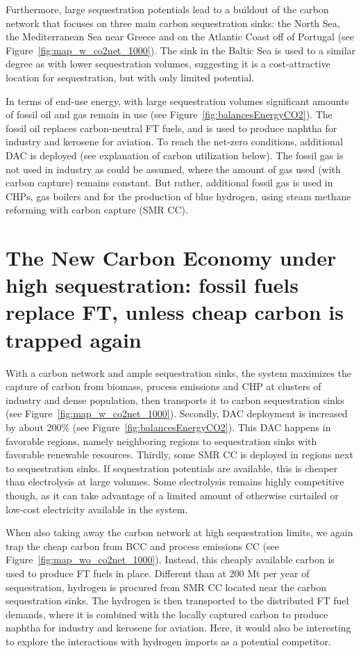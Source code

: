 \documentclass[10pt,5p,reversenotenum,lefttitle]{elsarticle}
\begin{document}
Furthermore, large sequestration potentials lead to a buildout of the carbon network that focuses on three main carbon sequestration sinks: the North Sea, the Mediterranean Sea near Greece and on the Atlantic Coast off of Portugal (see Figure~\ref{fig:map_w_co2net_1000}). The sink in the Baltic Sea is used to a similar degree as with lower sequestration volumes, suggesting it is a cost-attractive location for sequestration, but with only limited potential.

In terms of end-use energy, with large sequestration volumes significant amounts of fossil oil and gas remain in use (see Figure~\ref{fig:balancesEnergyCO2}). The fossil oil replaces carbon-neutral FT fuels, and is used to produce naphtha for industry and kerosene for aviation. To reach the net-zero conditions, additional DAC is deployed (see explanation of carbon utilization below). The fossil gas is not used in industry as could be assumed, where the amount of gas used (with carbon capture) remains constant. But rather, additional fossil gas is used in CHPs, gas boilers and for the production of blue hydrogen, using steam methane reforming with carbon capture (SMR CC).

\section*{The New Carbon Economy under high sequestration: fossil fuels replace FT, unless cheap carbon is trapped again}
\label{sec:highSequestration}
With a carbon network and ample sequestration sinks, the system maximizes the capture of carbon from biomass, process emissions and CHP at clusters of industry and dense population, then transports it to carbon sequestration sinks (see Figure~\ref{fig:map_w_co2net_1000}). Secondly, DAC deployment is increased by about 200\% (see Figure~\ref{fig:balancesEnergyCO2}). This DAC happens in favorable regions, namely neighboring regions to sequestration sinks with favorable renewable resources. Thirdly, some SMR CC is deployed in regions next to sequestration sinks. If sequestration potentials are available, this is cheaper than electrolysis at large volumes. Some electrolysis remains highly competitive though, as it can take advantage of a limited amount of otherwise curtailed or low-cost electricity available in the system.

When also taking away the carbon network at high sequestration limits, we again trap the cheap carbon from BCC and process emissions CC (see Figure~\ref{fig:map_wo_co2net_1000}). Instead, this cheaply available carbon is used to produce FT fuels in place. Different than at 200 Mt per year of sequestration, hydrogen is procured from SMR CC located near the carbon sequestration sinks. The hydrogen is then transported to the distributed FT fuel demands, where it is combined with the locally captured carbon to produce naphtha for industry and kerosene for aviation. Here, it would also be interesting to explore the interactions with hydrogen imports as a potential competitor.
\end{document}
